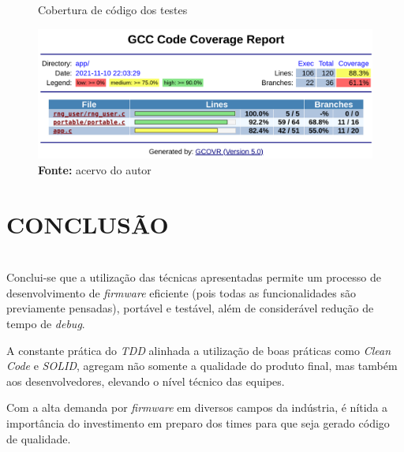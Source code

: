 \documentclass[times, twoside, watermark]{artigo}
\begin{document}
\begin{figure}[H]
  \centering
  \caption{Cobertura de código dos testes}
  \includegraphics[width=1\linewidth]{images/code-coverage-2.png}
  \caption*{\newline\textbf{Fonte:} acervo do autor}
  \label{fig:code-coverage}
\end{figure}


\section{CONCLUSÃO}\hfill\\
Conclui-se que a utilização das técnicas apresentadas permite um processo de
desenvolvimento de \textit{firmware} eficiente (pois todas as funcionalidades são
previamente pensadas), portável e testável, além de considerável redução de tempo de
\textit{debug}.

A constante prática do \textit{TDD} alinhada a utilização de boas práticas
como \textit{Clean Code} e \textit{SOLID}, agregam não somente a qualidade
do produto final, mas também aos desenvolvedores, elevando o nível técnico 
das equipes.

Com a alta demanda por \textit{firmware} em diversos campos da indústria, é nítida
a importância do investimento em preparo dos times para que seja gerado código 
de qualidade.



\end{document}
